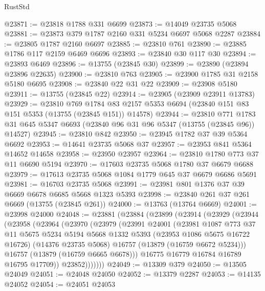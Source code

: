 \begin{lexlean}{RustStd}
\begin{coremodule}
@23871 := @23818 @1788 @331 @6699
@23873 := @14049 @23735 @5068
@23881 := @23873 @379 @1787 @2160 @331 @5234 @6697 @5068 @2287
@23884 := @23805 @1787 @2160 @6697
@23885 := @23810 @761
@23890 := @23885 @1786 @117 @2159 @6469 @6696
@23893 := @23840 @30 @117 @30
@23894 := @23893 @6469
@23896 := @13755 (@23845 @30)
@23899 := @23890 (@23894 @23896 @22635)
@23900 := @23810 @763
@23905 := @23900 @1785 @31 @2158 @5180 @6695
@23908 := @23840 @22 @31 @22
@23909 := @23908 @5180
@23911 := @13755 (@23845 @22)
@23914 := @23905 (@23909 @23911 @13783)
@23929 := @23810
    @769
    @1784
    @83
    @2157
    @5353
    @6694
    (@23840 @151 @83 @151 @5353 (@13755 (@23845 @151)) @14578)
@23944 := @23810
    @771
    @1783
    @31
    @645
    @5347
    @6693
    (@23840 @96 @31 @96 @5347 (@13755 (@23845 @96)) @14527)
@23945 := @23810 @842
@23950 := @23945 @1782 @37 @39 @5364 @6692
@23953 := @14641 @23735 @5068 @37
@23957 := @23953 @841 @5364 @14652 @14658
@23958 := @23950 @23957
@23964 := @23810 @1780 @773 @37 @11 @6690 @5194
@23970 := @17603 @23735 @5068 @1780 @37 @6679 @6688
@23979 := @17613 @23735 @5068 @1084 @1779 @645 @37 @6679 @6686 @5691
@23981 := @16703 @23735 @5068
@23991 := @23981 @801 @1376 @37 @39 @6669 @6678 @6685 @5668 @1323 @5393
@23998 := @23840 @261 @37 @261 @6669 (@13755 (@23845 @261))
@24000 := @13763 (@13764 @6669)
@24001 := @23998 @24000
@24048 := @23881
    (@23884
      (@23899
        (@23914
          (@23929
            (@23944
              (@23958
                (@23964
                  (@23970
                    (@23979
                      (@23991
                        @24001
                        (@23981
                          @1087
                          @773
                          @37
                          @11
                          @5675
                          @5234
                          @5194
                          @5668
                          @1332
                          @5393
                          (@23953 @1086 @5675 @16722 @16726)
                          (@14376 @23735 @5068)
                          @16757
                          (@13879 (@16759 @6672 @5234)))
                        @16757
                        (@13879 (@16759 @6665 @6678)))
                      @16775
                      @16779
                      @16784
                      @16789
                      @16795
                      @17709))
                  @23852)))))))
@24049 := @13309 @379
@24050 := @13505 @24049
@24051 := @24048 @24050
@24052 := @13379 @2287
@24053 := @14135 @24052
@24054 := @24051 @24053

\end{coremodule}
\end{lexlean}
